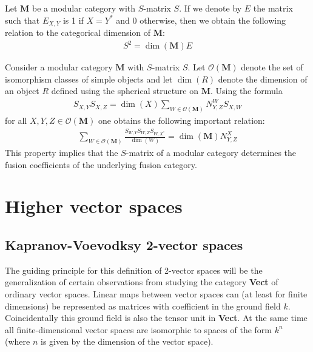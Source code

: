 	
	\begin{property}
		Let $\mathbf{M}$ be a modular category with $S$-matrix $S$. If we denote by $E$ the matrix such that $E_{X, Y}$ is 1 if $X=Y^*$ and 0 otherwise, then we obtain the following relation to the categorical dimension of $\mathbf{M}$:
		\begin{gather}
			S^2 = \dim(\mathbf{M})E
		\end{gather}
	\end{property}
	
	\begin{formula}[Verlinde]
		Consider a modular category $\mathbf{M}$ with $S$-matrix $S$. Let $\mathcal{O}(\mathbf{M})$ denote the set of isomorphism classes of simple objects and let $\dim(R)$ denote the dimension of an object $R$ defined using the spherical structure on $\mathbf{M}$. Using the formula
		\begin{gather}
			S_{X, Y}S_{X, Z} = \dim(X)\sum_{W\in\mathcal{O}(\mathbf{M})}N_{Y, Z}^WS_{X, W}
		\end{gather}
		for all $X, Y, Z\in\mathcal{O}(\mathbf{M})$ one obtains the following important relation:
		\begin{gather}
			\sum_{W\in\mathcal{O}(\mathbf{M})}\frac{S_{W, Y}S_{W, Z}S_{W, X^*}}{\dim(W)} = \dim(\mathbf{M})N_{Y, Z}^X
		\end{gather}
		This property implies that the $S$-matrix of a modular category determines the fusion coefficients of the underlying fusion category.
	\end{formula}

\section{Higher vector spaces}
\subsection{Kapranov-Voevodksy 2-vector spaces}

	The guiding principle for this definition of 2-vector spaces will be the generalization of certain observations from studying the category \textbf{Vect} of ordinary vector spaces. Linear maps between vector spaces can (at least for finite dimensions) be represented as matrices with coefficient in the ground field $k$. Coincidentally this ground field is also the tensor unit in \textbf{Vect}. At the same time all finite-dimensional vector spaces are isomorphic to spaces of the form $k^n$ (where $n$ is given by the dimension of the vector space).
	
